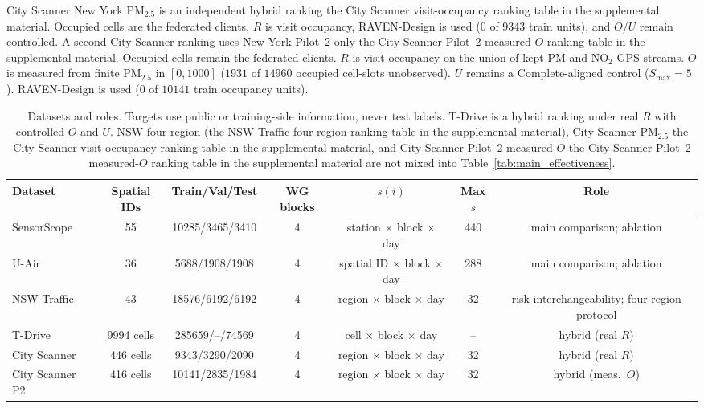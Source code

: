 \documentclass[letterpaper,journal]{IEEEtran}
\begin{document}
City Scanner New York {PM}$_{2.5}$ is an independent hybrid ranking
the City Scanner visit-occupancy ranking table in the supplemental material.  Occupied cells are the federated
clients, $R$ is visit occupancy, RAVEN-Design is used ($0$ of $9343$ train
units), and $O$/$U$ remain controlled.
A second City Scanner ranking uses New York Pilot~2 only
the City Scanner Pilot~2 measured-$O$ ranking table in the supplemental material.
Occupied cells remain the federated clients.
$R$ is visit occupancy on the union of kept-{PM} and {NO}$_2$ GPS streams.
$O$ is measured from finite {PM}$_{2.5}$ in $[0,1000]$
($1931$ of $14960$ occupied cell-slots unobserved).
$U$ remains a Complete-aligned control ($S_{\max}=5$).
RAVEN-Design is used ($0$ of $10141$ train occupancy units).

\begin{table}[t]
\centering
\caption{Datasets and roles.  Targets use public or training-side
information, never test labels.  T-Drive is a hybrid ranking under real
$R$ with controlled $O$ and $U$.  NSW four-region
(the NSW-Traffic four-region ranking table in the supplemental material), City Scanner {PM}$_{2.5}$
the City Scanner visit-occupancy ranking table in the supplemental material, and City Scanner Pilot~2 measured
$O$ the City Scanner Pilot~2 measured-$O$ ranking table in the supplemental material are not mixed into
Table~\ref{tab:main_effectiveness}.}
\label{tab:datasets}
\scriptsize
\setlength{\tabcolsep}{3.2pt}
\begin{tabular*}{\textwidth}{@{\extracolsep{\fill}}lcccccc}
\toprule
Dataset & Spatial IDs & Train/Val/Test & WG blocks &
$s(i)$ & Max $s$ & Role\\
\midrule
SensorScope~\cite{ingelrest2010sensorscope} & 55 & 10285/3465/3410 & 4 &
station $\times$ block $\times$ day & 440 & main comparison; ablation\\
U-Air~\cite{zheng2013uair} & 36 & 5688/1908/1908 & 4 &
spatial ID $\times$ block $\times$ day & 288 & main comparison; ablation\\
NSW-Traffic~\cite{tfnsw2024traffic} & 43 & 18576/6192/6192 & 4 &
region $\times$ block $\times$ day & 32 & risk interchangeability; four-region protocol\\
T-Drive~\cite{yuan2010tdrive} & 9994 cells & 285659/--/74569 & 4 &
cell $\times$ block $\times$ day & -- & hybrid (real $R$)\\
City Scanner~\cite{wang2023cityscanner} & 446 cells & 9343/3290/2090 & 4 &
region $\times$ block $\times$ day & 32 & hybrid (real $R$)\\
City Scanner P2 & 416 cells & 10141/2835/1984 & 4 &
region $\times$ block $\times$ day & 32 & hybrid (meas.\ $O$)\\
\bottomrule
\end{tabular*}
\end{table}
\end{document}
